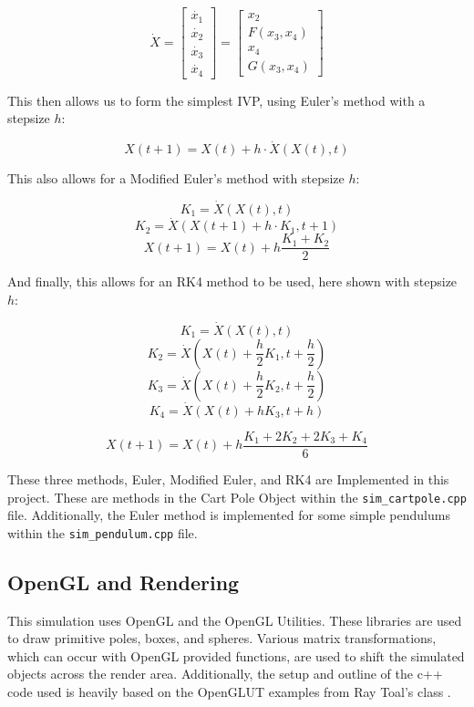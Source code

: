 \documentclass[12pt]{article}
\begin{document}
\[
\dot{X} =
\begin{bmatrix}
\dot{x_1} \\
\dot{x_2} \\
\dot{x_3} \\
\dot{x_4}
\end{bmatrix}
=
\begin{bmatrix}
x_2 \\
F(x_3, x_4) \\
x_4 \\
G(x_3, x_4)
\end{bmatrix}
\]

This then allows us to form the simplest IVP, using Euler's method with a stepsize $h$:

\begin{equation} \label{eq:9}
X(t+1) = X(t) + h \cdot \dot{X}(X(t),t)
\end{equation}

This also allows for a Modified Euler's method with stepsize $h$:

\[
K_1 = \dot{X}(X(t),t)
\]
\[
K_2 = \dot{X}(X(t+1) + h \cdot K_1,t+1)
\]
\begin{equation} \label{eq:10}
X(t+1) = X(t) + h \frac{K_1 + K_2}{2}
\end{equation}

And finally, this allows for an RK4 method to be used, here shown with stepsize $h$:

\[
K_1 = \dot{X}(X(t),t)
\]
\[
K_2 = \dot{X}(X(t)+ \frac{h}{2} K_1,t + \frac{h}{2})
\]
\[
K_3 = \dot{X}(X(t)+ \frac{h}{2} K_2,t + \frac{h}{2})
\]
\[
K_4 = \dot{X}(X(t)+ h K_3,t + h)
\]

\begin{equation} \label{eq:10}
X(t+1) = X(t) + h \frac{K_1 + 2K_2 + 2K_3 + K_4}{6}
\end{equation}

These three methods, Euler, Modified Euler, and RK4 are Implemented in this project. These are
methods in the Cart Pole Object within the \texttt{sim\_cartpole.cpp} file. Additionally,
the Euler method is implemented for some simple pendulums within the \texttt{sim\_pendulum.cpp}
file.

\subsection{OpenGL and Rendering}

This simulation uses OpenGL and the OpenGL Utilities. These libraries are used to
draw primitive poles, boxes, and spheres. Various matrix transformations, which can
occur with OpenGL provided functions, are used to shift the simulated objects across
the render area. Additionally, the setup and outline of the c++ code used is heavily
based on the OpenGLUT examples from Ray Toal's class \cite{glut}.
\end{document}
